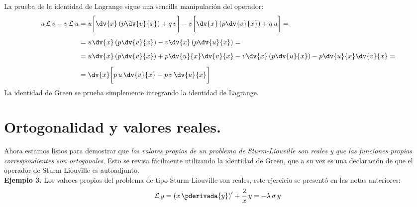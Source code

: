 La prueba de la identidad de Lagrange sigue una sencilla manipulación del operador:
\begin{align}
\begin{aligned}[b]
u \, \mathcal{L} \, v - v \, \mathcal{L} \, u &= u \bigg[ \dv{x} \left( p \dv{v}{x} \right) + q \, v \bigg] - v \bigg[ \dv{x} \left( p \dv{v}{x} \right) + q \, u \bigg] = \\[0.5em]
&= u \dv{x} \left( p \dv{v}{x} \right) - v \dv{x} \left( p \dv{u}{x} \right) = \\[0.5em]
&= u \dv{x} \left( p \dv{v}{x} \right) + p \dv{u}{x} \dv{v}{x} - v \dv{x} \left( p \dv{u}{x} \right) - p \dv{u}{x} \dv{v}{x} = \\[0.5em]
&= \dv{x} \bigg[ p \, u \, \dv{v}{x} - p \, v \, \dv{u}{x}  \bigg]
\end{aligned}
\label{eq:ecuacion_04_21}
\end{align}
La identidad de Green se prueba simplemente integrando la identidad de Lagrange.

\newpage

\section{Ortogonalidad y valores reales.}

Ahora estamos listos para demostrar que \emph{los valores propios de un problema de Sturm-Liouville son reales y que las funciones propias correspondientes son ortogonales}. Esto se revisa fácilmente utilizando la identidad de Green, que a su vez es una declaración de que el operador de Sturm-Liouville es autoadjunto.
\\
\noindent
\textbf{Ejemplo 3.} Los valores propios del problema de tipo Sturm-Liouville son reales, este ejercicio se presentó en las  notas anteriores:
\begin{align*}
\mathcal{L} \, y = \left( x \, \pderivada{y} \right)^{\prime} + \dfrac{2}{x} \, y = - \lambda \, \sigma \, y
\end{align*}

